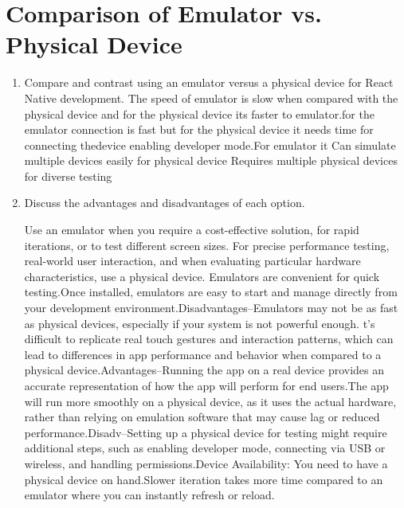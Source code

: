 \documentclass[a4paper,12pt]{article}
\begin{document}
\section{Comparison of Emulator vs. Physical Device }
\begin{enumerate}
    \item Compare and contrast using an emulator versus a physical device for React Native development.
    The speed of emulator is slow when compared with the physical device and for the physical device its faster to emulator.for the emulator connection is fast but for the physical device it needs time for connecting thedevice enabling developer mode.For emulator it Can simulate multiple devices easily for physical device	Requires multiple physical devices for diverse testing


    \item Discuss the advantages and disadvantages of each option.
    
    Use an emulator when you require a cost-effective solution, for rapid iterations, or to test different screen sizes.
For precise performance testing, real-world user interaction, and when evaluating particular hardware characteristics, use a physical device.
 Emulators are convenient for quick testing.Once installed, emulators are easy to start and manage directly from your development environment.Disadvantages--Emulators may not be as fast as physical devices, especially if your system is not powerful enough. t’s difficult to replicate real touch gestures and interaction patterns, which can lead to differences in app performance and behavior when compared to a physical device.Advantages--Running the app on a real device provides an accurate representation of how the app will perform for end users.The app will run more smoothly on a physical device, as it uses the actual hardware, rather than relying on emulation software that may cause lag or reduced performance.Disadv--Setting up a physical device for testing might require additional steps, such as enabling developer mode, connecting via USB or wireless, and handling permissions.Device Availability: You need to have a physical device on hand.Slower iteration takes more time compared to an emulator where you can instantly refresh or reload.
\end{enumerate}
\end{document}
